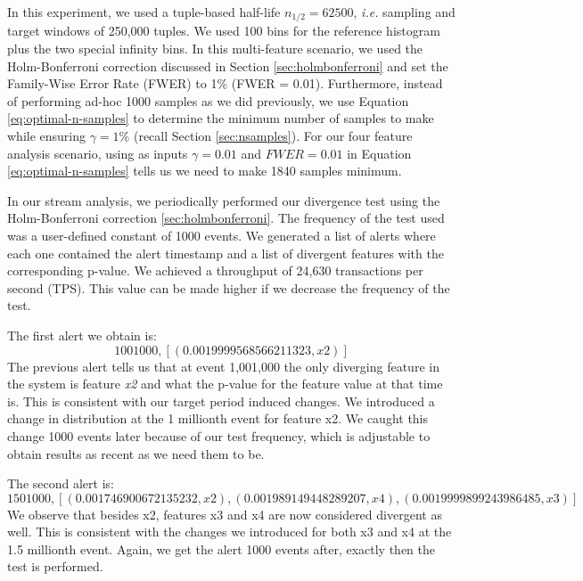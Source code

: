 In this experiment, we used a tuple-based half-life $n_{1/2}=62500$, \textit{i.e.} sampling and target windows of 250,000 tuples. We used 100 bins for the reference histogram plus the two special infinity bins. In this multi-feature scenario, we used the Holm-Bonferroni correction discussed in Section \ref{sec:holmbonferroni} and set the Family-Wise Error Rate (FWER) to 1\% (FWER = 0.01). Furthermore, instead of performing ad-hoc 1000 samples as we did previously, we use Equation \ref{eq:optimal-n-samples} to determine the minimum number of samples to make while ensuring $\gamma=1\%$ (recall Section \ref{sec:nsamples}). For our four feature analysis scenario, using as inputs  $\gamma=0.01$ and $FWER=0.01$ in Equation \ref{eq:optimal-n-samples} tells us we need to make 1840 samples minimum.

In our stream analysis, we periodically performed our divergence test using the Holm-Bonferroni correction \ref{sec:holmbonferroni}. The frequency of the test used was a user-defined constant of 1000 events. We generated a list of alerts where each one contained the alert timestamp and a list of divergent features with the corresponding p-value. We achieved a throughput of 24,630 transactions per second (TPS). This value can be made higher if we decrease the frequency of the test.

The first alert we obtain is:
\[1001000, [(0.0019999568566211323, x2)]\]
The previous alert tells us that at event 1,001,000 the only diverging feature in the system is feature \textit{x2} and what the p-value for the feature value at that time is. This is consistent with our target period induced changes. We introduced a change in distribution at the 1 millionth event for feature x2. We caught this change 1000 events later because of our test frequency, which is adjustable to obtain results as recent as we need them to be.

The second alert is:
\[1501000, [(0.001746900672135232, x2), (0.001989149448289207, x4), (0.0019999899243986485, x3)]\]
We observe that besides x2, features x3 and x4 are now considered divergent as well. This is consistent with the changes we introduced for both x3 and x4 at the 1.5 millionth event. Again, we get the alert 1000 events after, exactly then the test is performed.

